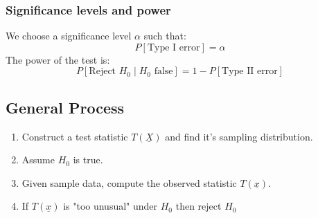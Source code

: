 \documentclass[12pt]{article}
\begin{document}
\subsubsection{Significance levels and power}
We choose a significance level \(\alpha\) such that:
\[P[\text{Type I error}]=\alpha\]
The power of the test is:
\[P[\text{Reject }H_0\mid H_0\text{ false}]=1-P[\text{Type II error}]\]
\subsection{General Process}
\begin{enumerate}
    \item Construct a test statistic \(T(\underline{X})\) and find it's sampling distribution.
    \item Assume \(H_0\) is true.
    \item Given sample data, compute the observed statistic \(T(\underline{x})\).
    \item If \(T(\underline{x})\) is "too unusual" under \(H_0\) then reject \(H_0\)
\end{enumerate}
\end{document}
